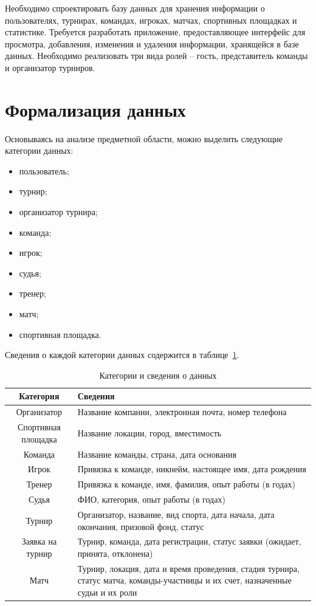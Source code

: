 Необходимо спроектировать базу данных для хранения информации о пользователях, турнирах, командах, игроках, матчах, спортивных площадках и статистике. Требуется разработать приложение, предоставляющее интерфейс для просмотра, добавления, изменения и удаления информации, хранящейся в базе данных. Необходимо реализовать три вида ролей -- гость, представитель команды и организатор турниров.


\section{Формализация данных}
Основываясь на анализе предметной области, можно выделить следующие категории данных:
\begin{itemize}
	\item пользователь;
	\item турнир;
	\item организатор турнира;
	\item команда;
	\item игрок;
	\item судья;
	\item тренер;
	\item матч;
	\item спортивная площадка.
\end{itemize}

Сведения о каждой категории данных содержится в таблице~\ref{tb:data}.

\begin{table}[ht]
	\begin{center}
		\begin{threeparttable}
			\caption{Категории и сведения о данных}
			\begin{tabular}{|c|p{10cm}|}
				\hline
				Категория & Сведения \\ \hline
				Организатор & Название компании, электронная почта, номер телефона \\ \hline
				Спортивная площадка & Название локации, город, вместимость \\ \hline
				Команда & Название команды, страна, дата основания \\ \hline
				Игрок & Привязка к команде, никнейм, настоящее имя, дата рождения \\ \hline
				Тренер & Привязка к команде, имя, фамилия, опыт работы (в годах) \\ \hline
				Судья & ФИО, категория, опыт работы (в годах) \\ \hline
				Турнир & Организатор, название, вид спорта, дата начала, дата окончания, призовой фонд, статус \\ \hline
				Заявка на турнир & Турнир, команда, дата регистрации, статус заявки (ожидает, принята, отклонена) \\ \hline
				Матч & Турнир, локация, дата и время проведения, стадия турнира, статус матча, команды-участницы и их счет, назначенные судьи и их роли \\ \hline
			\end{tabular}
			\label{tb:data} 
		\end{threeparttable}
	\end{center}
\end{table}

